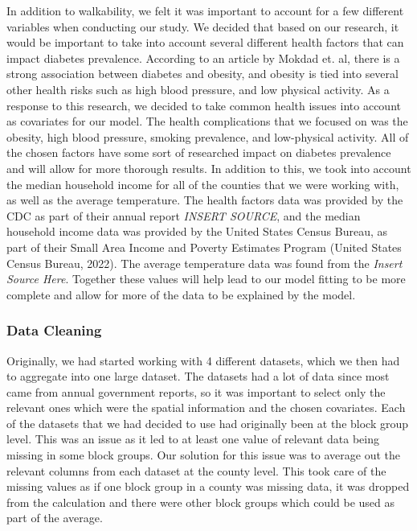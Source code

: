 \documentclass[
]{article}
\begin{document}
In addition to walkability, we felt it was important to account for a
few different variables when conducting our study. We decided that based
on our research, it would be important to take into account several
different health factors that can impact diabetes prevalence. According
to an article by Mokdad et. al, there is a strong association between
diabetes and obesity, and obesity is tied into several other health
risks such as high blood pressure, and low physical activity. As a
response to this research, we decided to take common health issues into
account as covariates for our model. The health complications that we
focused on was the obesity, high blood pressure, smoking prevalence, and
low-physical activity. All of the chosen factors have some sort of
researched impact on diabetes prevalence and will allow for more
thorough results. In addition to this, we took into account the median
household income for all of the counties that we were working with, as
well as the average temperature. The health factors data was provided by
the CDC as part of their annual report \emph{INSERT SOURCE}, and the
median household income data was provided by the United States Census
Bureau, as part of their Small Area Income and Poverty Estimates Program
(United States Census Bureau, 2022). The average temperature data was
found from the \emph{Insert Source Here}. Together these values will
help lead to our model fitting to be more complete and allow for more of
the data to be explained by the model.

\subsubsection{Data Cleaning}\label{data-cleaning}

Originally, we had started working with 4 different datasets, which we
then had to aggregate into one large dataset. The datasets had a lot of
data since most came from annual government reports, so it was important
to select only the relevant ones which were the spatial information and
the chosen covariates. Each of the datasets that we had decided to use
had originally been at the block group level. This was an issue as it
led to at least one value of relevant data being missing in some block
groups. Our solution for this issue was to average out the relevant
columns from each dataset at the county level. This took care of the
missing values as if one block group in a county was missing data, it
was dropped from the calculation and there were other block groups which
could be used as part of the average.
\end{document}
